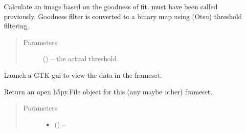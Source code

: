 \documentclass[letterpaper,10pt,english]{sphinxmanual}
\begin{document}
\begin{fulllineitems}
\begin{fulllineitems}
\end{fulllineitems}


\begin{fulllineitems}
\label{\detokenize{xanespy:xanespy.xanes_frameset.XanesFrameset.goodness_mask}}
Calculate an image based on the goodness of fit. 
must have been called previously. Goodness filter is converted
to a binary map using (Otsu) threshold filtering.
\begin{quote}\begin{description}
\item[{Parameters}] \leavevmode
{} (\sphinxstyleliteralemphasis{-}) -- the actual threshold.

\end{description}\end{quote}

\end{fulllineitems}


\begin{fulllineitems}
\label{\detokenize{xanespy:xanespy.xanes_frameset.XanesFrameset.gtk_viewer}}
Launch a GTK gui to view the data in the frameset.

\end{fulllineitems}


\begin{fulllineitems}
\label{\detokenize{xanespy:xanespy.xanes_frameset.XanesFrameset.has_representation}}
\end{fulllineitems}


\begin{fulllineitems}
\label{\detokenize{xanespy:xanespy.xanes_frameset.XanesFrameset.hdf_file}}
Return an open h5py.File object for this (any maybe other) frameset.
\begin{quote}\begin{description}
\item[{Parameters}] \leavevmode\begin{itemize}
\item {} 
 (\sphinxstyleliteralemphasis{, }) -- 


\end{itemize}
\end{description}
\end{quote}
\end{fulllineitems}
\end{fulllineitems}
\end{document}
